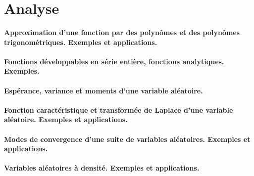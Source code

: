 \section{Analyse}

\paragraph{Approximation d’une fonction par des polynômes et des polynômes trigonométriques. Exemples et applications.}
\paragraph{Fonctions développables en série entière, fonctions analytiques. Exemples.}
\paragraph{Espérance, variance et moments d’une variable aléatoire.}
\paragraph{Fonction caractéristique et transformée de Laplace d’une variable aléatoire. Exemples et applications.}
\paragraph{Modes de convergence d’une suite de variables aléatoires. Exemples et applications.}
\paragraph{Variables aléatoires à densité. Exemples et applications.}
